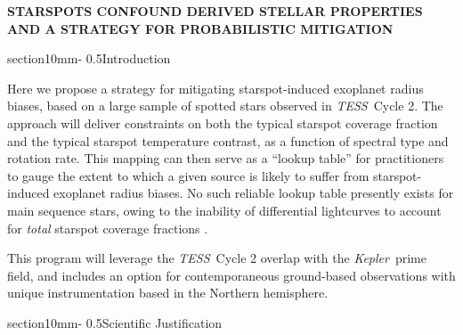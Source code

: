 \documentclass[letterpaper,11pt]{article}
\makeatletter
\renewcommand{\section}{\@startsection%
{section}{1}{0mm}{-\baselineskip}%
{0.5\baselineskip}{\normalfont\Large\bfseries}}%
\newcommand{\tess}{{\it TESS}}
\newcommand{\kepler}{{\it Kepler}}
\makeatother
\begin{document}
\pagestyle{plain}




\begin{center}
\bfseries\uppercase{%
Starspots confound derived stellar properties and a strategy for probabilistic mitigation
}
\end{center}




\section{Introduction}

Here we propose a strategy for mitigating starspot-induced exoplanet radius biases, based on a large sample of spotted stars observed in \tess\ Cycle 2.  The approach will deliver constraints on both the typical starspot coverage fraction and the typical starspot temperature contrast, as a function of spectral type and rotation rate.  This mapping can then serve as a ``lookup table'' for practitioners to gauge the extent to which a given source is likely to suffer from starspot-induced exoplanet radius biases.  No such reliable lookup table presently exists for main sequence stars, owing to the inability of differential lightcurves to account for \emph{total} starspot coverage fractions \citep{2018ApJ...865..142B}.

This program will leverage the \tess\ Cycle 2 overlap with the \kepler\ prime field, and includes an option for contemporaneous ground-based observations with unique instrumentation based in the Northern hemisphere.

\section{Scientific Justification}
\end{document}
